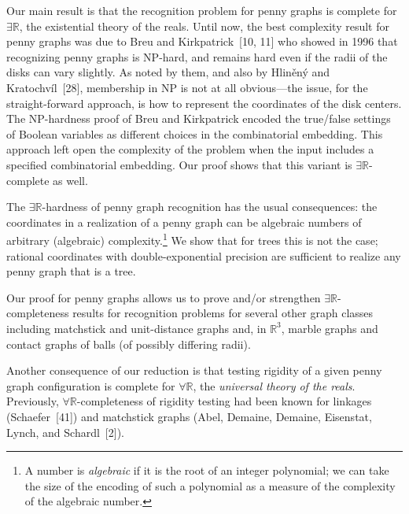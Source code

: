 \documentclass{article}
\begin{document}
Our main result is that the recognition problem for penny graphs 
is complete for \ensuremath{\exists\mathbb{R}}, the existential theory of the reals.  
Until now, the best complexity result for penny graphs was due to Breu and Kirkpatrick~[10, 11] who showed 
in 1996
that recognizing penny graphs is \textsf{NP}-hard, and remains hard even if the radii of the disks can vary slightly.   As noted by them, and
also by Hliněný and Kratochvíl~[28],
membership in NP is not at all obvious---the issue, for the straight-forward approach,   
is how to represent the coordinates of the disk centers.
The \textsf{NP}-hardness proof of Breu and Kirkpatrick encoded the true/false settings of Boolean variables as different choices in the combinatorial embedding.  This approach left open 
the complexity of the problem 
when the input includes a specified combinatorial embedding. 
Our proof shows that this variant is \ensuremath{\exists\mathbb{R}}-complete as well.  

The \ensuremath{\exists\mathbb{R}}-hardness of penny graph recognition has the usual consequences: the coordinates in a realization of a penny graph can be algebraic numbers of arbitrary (algebraic) complexity.\footnote{A number is {\em algebraic} if it is the root of an integer polynomial; we can take the size of the encoding of such a polynomial as a measure of the complexity of the algebraic number.} We show that for trees this is not the case; rational coordinates with double-exponential precision are sufficient to realize any penny graph 
that is a tree.

Our proof for penny graphs allows us to prove and/or strengthen \ensuremath{\exists\mathbb{R}}-completeness results for recognition problems for several other graph classes including matchstick and unit-distance graphs and, in $\ensuremath{\mathbb{R}}^3$, marble graphs and contact graphs of balls (of possibly differing radii). 

Another consequence of our reduction is that testing rigidity of a given penny graph configuration is complete for \ensuremath{\forall\mathbb{R}}, the {\em universal theory of the reals}. Previously, \ensuremath{\forall\mathbb{R}}-completeness of rigidity testing had been known for linkages (Schaefer~[41]) and matchstick graphs (Abel, Demaine, Demaine, Eisenstat, Lynch, and Schardl~[2]).
\end{document}
